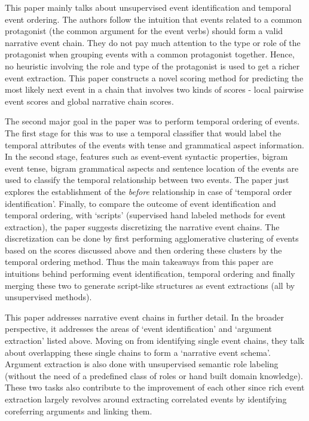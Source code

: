 
This paper mainly talks about unsupervised event identification and temporal event ordering. The authors follow the intuition that events related to a common protagonist (the common argument for the event verbs) should form a valid narrative event chain. They do not pay much attention to the type or role of the protagonist when grouping events with a common protagonist together. Hence, no heuristic involving the role and type of the protagonist is used to get a richer event extraction. This paper constructs a novel scoring method for predicting the most likely next event in a chain that involves two kinds of scores - local pairwise event scores and global narrative chain scores.

The second major goal in the paper was to perform temporal ordering of events. The first stage for this was to use a temporal classifier that would label the temporal attributes of the events with tense and grammatical aspect information. In the second stage, features such as event-event syntactic properties, bigram event tense, bigram grammatical aspects and sentence location of the events are used to classify the temporal relationship between two events. The paper just explores the establishment of the {\em before} relationship in case of ‘temporal order identification’. Finally, to compare the outcome of event identification and temporal ordering, with ‘scripts’ (supervised hand labeled methods for event extraction), the paper suggests discretizing the narrative event chains. The discretization can be done by first performing agglomerative clustering of events based on the scores discussed above and then ordering these clusters by the temporal ordering method.
Thus the main takeaways from this paper are intuitions behind performing event identification, temporal ordering and finally merging these two to generate script-like structures as event extractions (all by unsupervised methods).


This paper addresses narrative event chains in further detail. In the broader perspective, it addresses the areas of ‘event identification’ and ‘argument extraction’ listed above. Moving on from identifying single event chains, they talk about overlapping these single chains to form a ‘narrative event schema’. Argument extraction is also done with unsupervised semantic role labeling (without the need of a predefined class of roles or hand built domain knowledge). These two tasks also contribute to the improvement of each other since rich event extraction largely revolves around extracting correlated events by identifying coreferring arguments and linking them. 

